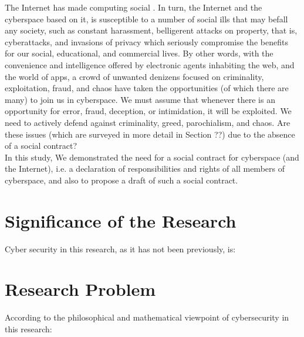The Internet has made computing social \cite{parameswaran2007social}. In turn, the Internet and the cyberspace based on it, is susceptible to a number of social ills that may befall any society, such as constant harassment, belligerent attacks on property, that is, cyberattacks, and invasions of privacy which seriously compromise the benefits for our social, educational, and commercial lives. By other words, with the convenience and intelligence offered by electronic agents inhabiting the web, and the world of apps, a crowd of unwanted denizens focused on criminality, exploitation, fraud, and chaos have taken the opportunities (of which there are many) to join us in cyberspace.  We must assume that whenever there is an opportunity for error, fraud, deception, or intimidation, it will be exploited. We need to actively defend against criminality, greed, parochialism, and chaos. Are these issues (which are surveyed in more detail in Section ??) due to the absence of a social contract? \\ In this study, We demonstrated the need for a social contract for cyberspace (and the Internet), i.e. a declaration of responsibilities and rights of all members of cyberspace, and also to propose a draft of such a social contract.

\section{Significance of the Research}

Cyber security in this research, as it has not been previously, is:


\section{Research Problem}
According to the philosophical and mathematical viewpoint of cybersecurity in this research:

